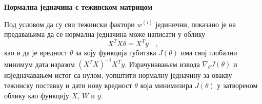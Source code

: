 \item{} {\bf Нормална једначина с тежинском матрицом}

Под условом да су сви тежински фактори $w^{(i)}$ јединични, показано је на предавањима да се нормална једначина може написати у облику
\begin{equation}
 X^TX\theta=X^Ty\quad,
\end{equation}
као и да је вредност $\theta$ за коју функција губитака $J(\theta)$ има свој глобални минимум дата изразом $(X^TX)^{-1}X^Ty$. Израчунавањем извода $\nabla_\theta J(\theta)$ и изједначавањем истог са нулом, уопштити нормалну једначину за овакву тежинску поставку и дати нову вредност $\theta$ која минимизира $J(\theta)$ у затвореном облику као функцију $X$, $W$ и $y$.


